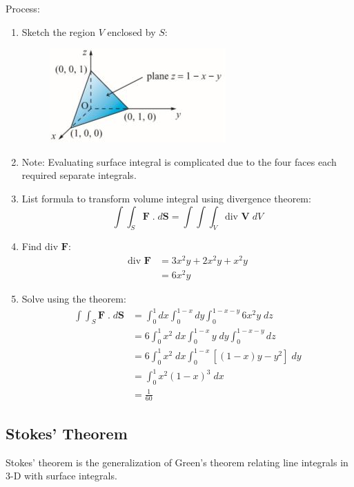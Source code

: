 \documentclass[10pt,a4paper]{article}
\begin{document}
Process:
\begin{enumerate}
\item Sketch the region $V$ enclosed by $S$:
\begin{figure} [h!]
    \centering
    \includegraphics[scale=0.75]{Ex1_Gauss.JPG}
\end{figure}

\item Note: Evaluating surface integral is complicated due to the four faces each required separate
integrals. 

\item List formula to transform volume integral using divergence theorem:
$$
    \int \int_S \textbf{F}\;.\;d \textbf{S} = \int \int \int_V \text{div }\textbf{V}\; dV 
$$

\item Find $\text{div }\textbf{F}$:
\begin{align*}
    \text{div }\textbf{F} &= 3x^2y + 2x^2y + x^2y \\
    &= 6x^2y    
\end{align*}

\item Solve using the theorem:
\begin{align*}
    \int \int_S \textbf{F}\; . \; d \textbf{S} &= \int_0^1 dx \int_0^{1-x}dy \int_0^{1-x-y} 6x^2y\; dz \\
    &= 6\int_0^1 x^2\;dx \int_0^{1-x}y\; dy \int_0^{1-x-y} dz \\
    &= 6\int_0^1x^2\; dx\int_0^{1-x}[(1-x)y-y^2]\; dy \\
    &= \int_0^1 x^2(1-x)^3 \; dx \\
    &= \frac{1}{60}
\end{align*}
\end{enumerate}

\subsection{Stokes' Theorem}

Stokes' theorem is the generalization of Green's theorem relating line integrals in 3-D with surface
integrals.
\end{document}
